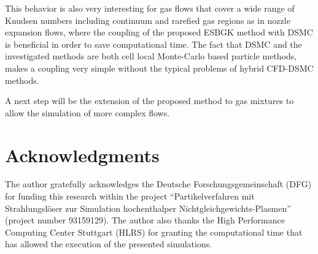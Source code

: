 \documentclass[aip,pof,amsmath,amssymb,preprint]{revtex4-1}
\begin{document}
This behavior is also very interesting for gas flows that cover a wide range of Knudsen numbers including continuum and rarefied gas regions as in nozzle expansion flows,
where the coupling of the proposed ESBGK method with DSMC is beneficial in order to save computational time.
The fact that DSMC and the investigated methods are both cell local Monte-Carlo based particle methods, makes a coupling very simple without the typical problems
of hybrid CFD-DSMC methods.

A next step will be the extension of the proposed method to gas mixtures to allow the simulation of more complex flows. 

\section*{Acknowledgments}

The author gratefully acknowledges the Deutsche Forschungsgemeinschaft (DFG) for funding this research within the
project “Partikelverfahren mit Strahlungslöser zur Simulation hochenthalper Nichtgleichgewichts-Plasmen” (project number 93159129). 
The author also thanks the High Performance Computing Center Stuttgart (HLRS) for granting the computational time that has allowed the execution of
the presented simulations.
 

\end{document}
